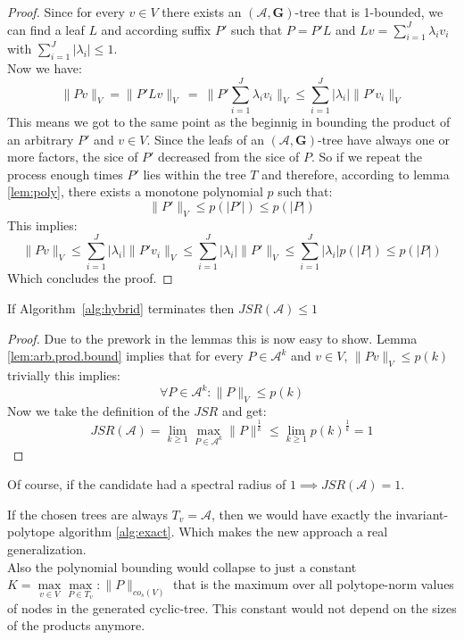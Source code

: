 \begin{proof}
  Since for every $v \in V$ there exists an $(\mathcal{A},\mathbf{G})\text{-tree}$ that is 1-bounded, we can find a leaf $L$ and according suffix $P'$ such that $P = P'L$ and $Lv = \sum _{i=1}^{J} \lambda _{i} v_{i}$ with $\sum _{i=1}^{J} |\lambda _{i} |\leq 1$. \\
  Now we have: 
  \begin{equation*}
  \| Pv\| _{V} =\| P'Lv\| _{V} \ =\ \| P'\sum _{i=1}^{J} \lambda _{i} v_{i} \| _{V} \leq \sum _{i=1}^{J} |\lambda _{i} |\| P'v_{i} \| _{V}
  \end{equation*}
  This means we got to the same point as the beginnig in bounding the product of an arbitrary $P'$ and $v \in V$. Since the leafs of an $(\mathcal{A},\mathbf{G})\text{-tree}$ have always one or more factors, the sice of $P'$ decreased from the sice of $P$. So if we repeat the process enough times $P'$ lies within the tree $T$ and therefore, according to lemma \ref{lem:poly}, there exists a monotone polynomial $p$ such that: $$\|P'\| _{V} \leq p(|P'|) \leq p(|P|)$$
  This implies:
  \begin{equation*}
  \| Pv\| _{V} \leq \sum _{i=1}^{J} |\lambda _{i} |\| P'v_{i} \| _{V} \leq \sum _{i=1}^{J} |\lambda _{i} |\| P'\| _{V} \leq \sum _{i=1}^{J} |\lambda _{i} |p( |P|) \leq p( |P|)
  \end{equation*}
  Which concludes the proof.
\end{proof}

\begin{theorem}{}\label{thm:hybrid-found}
If Algorithm~\ref{alg:hybrid} terminates then $JSR(\mathcal{A}) \leq 1$
\end{theorem}

\begin{proof}
  Due to the prework in the lemmas this is now easy to show. 
  Lemma \ref{lem:arb.prod.bound} implies that for every $P \in \mathcal{A}^k$ and $v \in V$, $\lVert Pv \rVert _V \le p(k)$
  trivially this implies: 
  $$
    \forall P \in \mathcal{A}^k: \lVert P \rVert _V \le p(k)
  $$
  Now we take the definition of the $JSR$ and get:
  $$
    JSR(\mathcal{A}) = \lim_{k \geq 1} \max_{P \in \mathcal{A}^k} \lVert P \rVert^\frac{1}{k} \le \lim_{k \geq 1} p(k)^\frac{1}{k} = 1
  $$ 
\end{proof}

Of course, if the candidate had a spectral radius of $1 \implies JSR(\mathcal{A}) = 1$.

\begin{corollary}
  If the chosen trees are always $T_v = \mathcal{A}$, then we would have exactly the invariant-polytope algorithm \ref{alg:exact}. 
  Which makes the new approach a real generalization. \\
  Also the polynomial bounding would collapse to just a constant $ K = \max\limits_{v \in V}\max\limits_{P \in T_{v}}: \lVert P \rVert _{co_{s}(V)}$ that is the maximum over all polytope-norm values of nodes in the generated cyclic-tree. This constant would not depend on the sizes of the products anymore.
\end{corollary}

